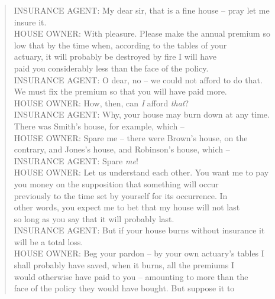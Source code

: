 \documentclass[11pt]{article}
\begin{document}
\begin{quote}   INSURANCE AGENT:  My dear sir, that is a fine house -- pray let me \\
      insure it. \\
  HOUSE OWNER:  With pleasure.  Please make the annual premium so \\
      low that by the time when, according to the tables of your \\
      actuary, it will probably be destroyed by fire I will have \\
      paid you considerably less than the face of the policy. \\
  INSURANCE AGENT:  O dear, no -- we could not afford to do that. \\
      We must fix the premium so that you will have paid more. \\
  HOUSE OWNER:  How, then, can {\em I} afford {\em that}? \\
  INSURANCE AGENT:  Why, your house may burn down at any time. \\
      There was Smith's house, for example, which -- \\
  HOUSE OWNER:  Spare me -- there were Brown's house, on the \\
      contrary, and Jones's house, and Robinson's house, which -- \\
  INSURANCE AGENT:  Spare {\em me}! \\
  HOUSE OWNER:  Let us understand each other.  You want me to pay \\
      you money on the supposition that something will occur \\
      previously to the time set by yourself for its occurrence.  In \\
      other words, you expect me to bet that my house will not last \\
      so long as you say that it will probably last. \\
  INSURANCE AGENT:  But if your house burns without insurance it \\
      will be a total loss. \\
  HOUSE OWNER:  Beg your pardon -- by your own actuary's tables I \\
      shall probably have saved, when it burns, all the premiums I \\
      would otherwise have paid to you -- amounting to more than the \\
      face of the policy they would have bought.  But suppose it to \\

\end{quote}
\end{document}
